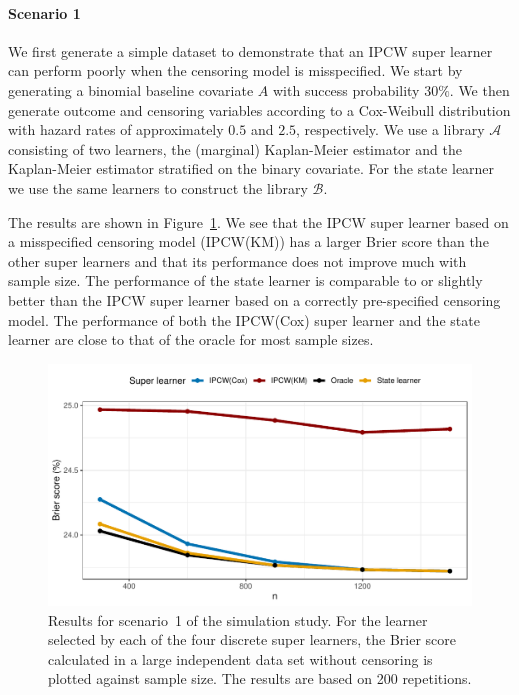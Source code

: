 \documentclass[a4,danish]{article}
\begin{document}
\paragraph{Scenario 1}

We first generate a simple dataset to demonstrate that an IPCW super learner can
perform poorly when the censoring model is misspecified. We start by generating a
binomial baseline covariate \( A \) with success probability \( 30\% \). We then
generate outcome and censoring variables according to a Cox-Weibull distribution
with hazard rates of approximately \( 0.5 \) and \( 2.5 \), respectively. We use
a library \( \mathcal{A} \) consisting of two learners, the (marginal)
Kaplan-Meier estimator and the Kaplan-Meier estimator stratified on the binary
covariate. For the state learner we use the same learners to construct the
library \( \mathcal{B} \).

The results are shown in Figure~\ref{fig:ipcw-fail}. We see that the IPCW super
learner based on a misspecified censoring model (IPCW(KM)) has a larger Brier
score than the other super learners and that its performance does not improve
much with sample size. %
The performance of the state learner is comparable to or slightly better than
the IPCW super learner based on a correctly pre-specified censoring model. The
performance of both the IPCW(Cox) super learner and the state learner are close
to that of the oracle for most sample sizes.

\begin{figure}
  \centerline{\includegraphics[width=1\linewidth]{./figures/ipcw-fail.pdf}}
  \caption[]{Results for scenario~1 of the simulation study. For the learner
    selected by each of the four discrete super learners, the Brier score
    calculated in a large independent data set without censoring is plotted
    against sample size. The results are based on 200 repetitions.}
  \label{fig:ipcw-fail}
\end{figure}
\end{document}
